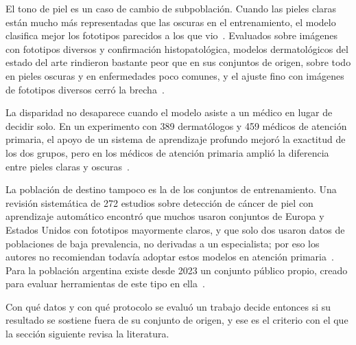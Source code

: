 El tono de piel es un caso de cambio de subpoblación. Cuando las pieles claras están mucho más representadas
que las oscuras en el entrenamiento, el modelo clasifica mejor los fototipos parecidos a los que
vio~\cite{groh2021neural}. Evaluados sobre imágenes con fototipos diversos y confirmación histopatológica,
modelos dermatológicos del estado del arte rindieron bastante peor que en sus conjuntos de origen, sobre todo
en pieles oscuras y en enfermedades poco comunes, y el ajuste fino con imágenes de fototipos diversos cerró la
brecha~\cite{daneshjou2022disparities}.

\begingroup La disparidad no desaparece cuando el modelo asiste a un médico en lugar de decidir solo. En un
experimento con 389 dermatólogos y 459 médicos de atención primaria, el apoyo de un sistema de aprendizaje
profundo mejoró la exactitud de los dos grupos, pero en los médicos de atención primaria amplió la diferencia
entre pieles claras y oscuras~\cite{groh2024learningaided}. \par\endgroup

La población de destino tampoco es la de los conjuntos de entrenamiento. Una revisión sistemática de 272
estudios sobre detección de cáncer de piel con aprendizaje automático encontró que muchos usaron conjuntos de
Europa y Estados Unidos con fototipos mayormente claros, y que solo dos usaron datos de poblaciones de baja
prevalencia, no derivadas a un especialista; por eso los autores no recomiendan todavía adoptar estos modelos en atención
primaria~\cite{jones2022intelligence}. Para la población argentina existe desde 2023 un conjunto público propio,
creado para evaluar herramientas de este tipo en ella~\cite{riccilara2023dataset}.

Con qué datos y con qué protocolo se evaluó un trabajo decide entonces si su resultado se sostiene fuera de su
conjunto de origen, y ese es el criterio con el que la sección siguiente revisa la literatura.
